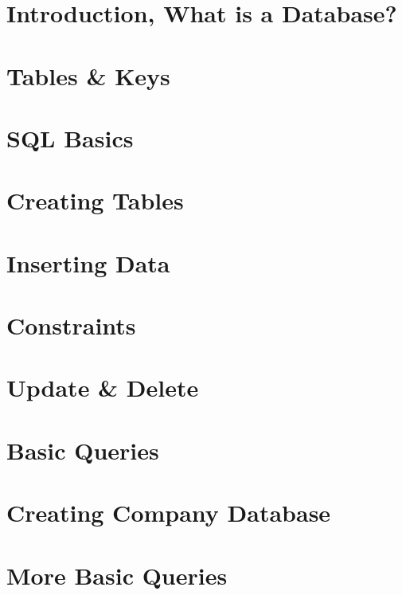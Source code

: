 \documentclass[openany]{book}
\begin{document}

\tableofcontents

\chapter{Introduction, What is a Database?}


\chapter{Tables \& Keys}


\chapter{SQL Basics}


\chapter{Creating Tables}


\chapter{Inserting Data}


\chapter{Constraints }


\chapter{Update \& Delete}


\chapter{Basic Queries}


\chapter{Creating Company Database}


\chapter{More Basic Queries}

\end{document}
